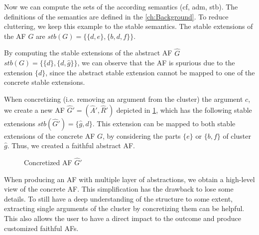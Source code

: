 Now we can compute the sets of the according semantics (cf, adm, stb). The definitions of the semantics are defined in the \cref{ch:Background}. To reduce cluttering, we keep this example to the stable semantics. The stable extensions of the AF $G$ are $stb(G) = \bigl\{\{d, e\}, \{b, d, f\}\bigl\}$.

By computing the stable extensions of the abstract AF $\hat{G}$ $stb(G) = \bigl\{\{d\}, \{d, \hat{g}\}\bigl\}$, we can observe that the AF is spurious due to the extension $\{d\}$, since the abstract stable extension cannot be mapped to one of the concrete stable extensions.

When concretizing (i.e. removing an argument from the cluster) the argument $c$, we create a new AF $\hat{G}' = (\hat{A}', \hat{R}')$ depicted in \cref{af:introExample3}, which has the following stable extensions $stb(\hat{G}') = \{\hat{g}, d\}$. This extension can be mapped to both stable extensions of the concrete AF $G$, by considering the parts $\{e\}$ or $\{b, f\}$ of cluster $\hat{g}$. Thus, we created a faithful abstract AF.

\begin{figure}[h]
    \centering
    \caption{Concretized AF $\hat{G}'$}
    \label{af:introExample3}
\end{figure}


When producing an AF with multiple layer of abstractions, we obtain a high-level view of the concrete AF. This simplification has the drawback to lose some details. To still have a deep understanding of the structure to some extent, extracting single arguments of the cluster by concretizing them can be helpful. This also allows the user to have a direct impact to the outcome and produce customized faithful AFs.


